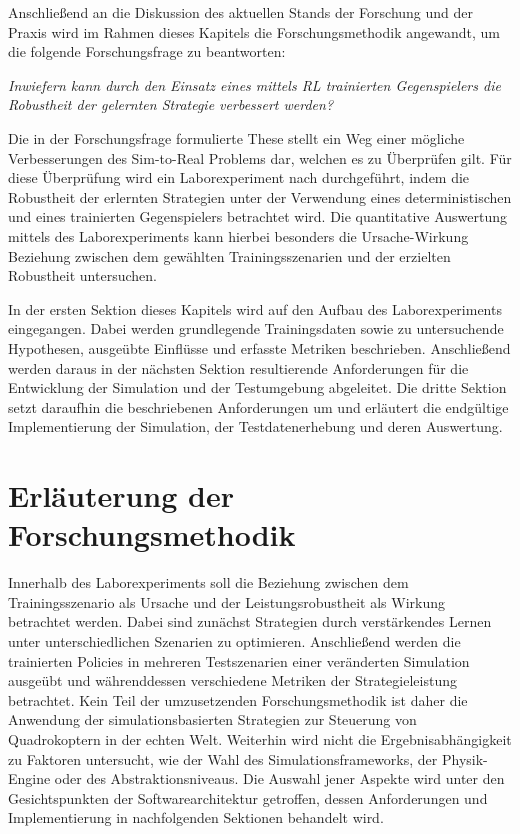 Anschließend an die Diskussion des aktuellen Stands der Forschung und der Praxis wird im Rahmen dieses Kapitels die Forschungsmethodik angewandt, um die folgende Forschungsfrage zu beantworten:

\textit{Inwiefern kann durch den Einsatz eines mittels RL trainierten Gegenspielers die Robustheit der gelernten Strategie verbessert werden?}

Die in der Forschungsfrage formulierte These stellt ein Weg einer mögliche Verbesserungen des Sim-to-Real Problems dar, welchen es zu Überprüfen gilt. %
Für diese Überprüfung wird ein Laborexperiment nach \cite[]{Recker.2021} durchgeführt, indem die Robustheit der erlernten Strategien unter der Verwendung eines deterministischen und eines trainierten Gegenspielers betrachtet wird. 
Die quantitative Auswertung mittels des Laborexperiments kann hierbei besonders die Ursache-Wirkung Beziehung zwischen dem gewählten Trainingsszenarien und der erzielten Robustheit untersuchen.

In der ersten Sektion dieses Kapitels wird auf den Aufbau des Laborexperiments eingegangen.
Dabei werden grundlegende Trainingsdaten sowie zu untersuchende Hypothesen, ausgeübte Einflüsse und erfasste Metriken beschrieben.
Anschließend werden daraus in der nächsten Sektion resultierende Anforderungen für die Entwicklung der Simulation und der Testumgebung abgeleitet. 
Die dritte Sektion setzt daraufhin die beschriebenen Anforderungen um und erläutert die endgültige Implementierung der Simulation, der Testdatenerhebung und deren Auswertung.

\section{Erläuterung der Forschungsmethodik}

Innerhalb des Laborexperiments soll die Beziehung zwischen dem Trainingsszenario als Ursache und der Leistungsrobustheit als Wirkung betrachtet werden.
Dabei sind zunächst Strategien durch verstärkendes Lernen unter unterschiedlichen Szenarien zu optimieren. 
Anschließend werden die trainierten Policies in mehreren Testszenarien einer veränderten Simulation ausgeübt und währenddessen verschiedene Metriken der Strategieleistung betrachtet.
Kein Teil der umzusetzenden Forschungsmethodik ist daher die Anwendung der simulationsbasierten Strategien zur Steuerung von Quadrokoptern in der echten Welt. 
Weiterhin wird nicht die Ergebnisabhängigkeit zu Faktoren untersucht, wie der Wahl des Simulationsframeworks, der Physik-Engine oder des Abstraktionsniveaus.
Die Auswahl jener Aspekte wird unter den Gesichtspunkten der Softwarearchitektur getroffen, dessen Anforderungen und Implementierung in nachfolgenden Sektionen behandelt wird.

